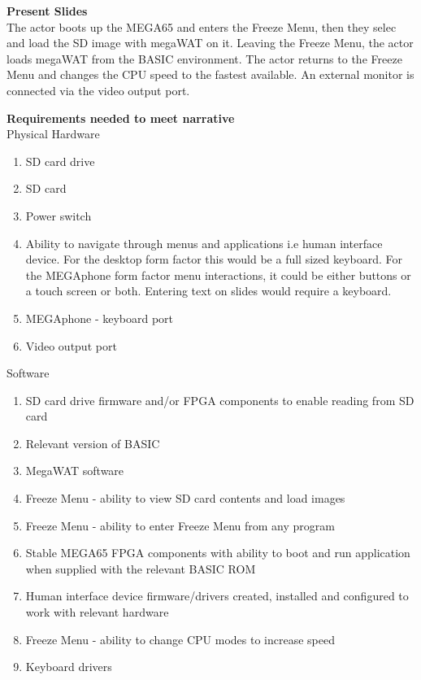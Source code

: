 \textbf{Present Slides}\\
The actor boots up the MEGA65 and enters the Freeze Menu, then they selec and load the SD image with megaWAT on it. Leaving the Freeze Menu, the actor loads megaWAT from the BASIC environment. The actor returns to the Freeze Menu and changes the CPU speed to the fastest available. An external monitor is connected via the video output port.

\textbf{Requirements needed to meet narrative}\\
Physical Hardware
\begin{enumerate}
\item SD card drive
\item SD card
\item Power switch
\item Ability to navigate through menus and applications i.e human interface device. For the desktop form factor this would be a full sized keyboard. For the MEGAphone form factor menu interactions, it could be either buttons or a touch screen or both. Entering text on slides would require a keyboard.
\item MEGAphone - keyboard port
\item Video output port
\end{enumerate}

Software\\
\begin{enumerate}
\item SD card drive firmware and/or FPGA components to enable reading from SD card
\item Relevant version of BASIC 
\item MegaWAT software
\item Freeze Menu - ability to view SD card contents and load images
\item Freeze Menu - ability to enter Freeze Menu from any program
\item Stable MEGA65 FPGA components with ability to boot and run application when supplied with the relevant BASIC ROM
\item Human interface device firmware/drivers created, installed and configured to work with relevant hardware
\item Freeze Menu - ability to change CPU modes to increase speed
\item Keyboard drivers
\end{enumerate}

